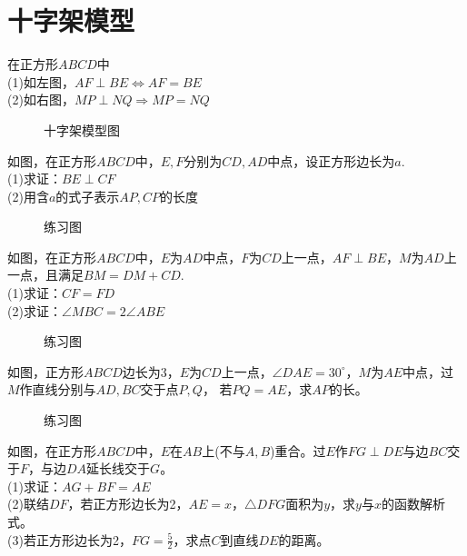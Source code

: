 \section{十字架模型}
\begin{definition}
    在正方形$ABCD$中 \\
    (1)如左图，$AF\perp BE \Leftrightarrow AF=BE$ \\
    (2)如右图，$MP\perp NQ \Rightarrow MP=NQ$
\end{definition}
\begin{figure}[H]
    \centering
    \resizebox{6cm}{!}{}
    \caption{十字架模型图}
\end{figure}
\begin{problem}
如图，在正方形$ABCD$中，$E,F$分别为$CD,AD$中点，设正方形边长为$a$. \\
(1)求证：$BE\perp CF$ \\
(2)用含$a$的式子表示$AP,CP$的长度
\end{problem}
\begin{figure}[H]
    \centering
    \resizebox{3cm}{!}{}
    \caption{练习图}
\end{figure}
\begin{problem}
如图，在正方形$ABCD$中，$E$为$AD$中点，$F$为$CD$上一点，$AF\perp BE$，$M$为$AD$上一点，且满足$BM=DM+CD$. \\
(1)求证：$CF=FD$ \\
(2)求证：$\angle MBC=2\angle ABE$
\end{problem}
\begin{figure}[H]
    \centering
    \resizebox{4cm}{!}{}
    \caption{练习图}
\end{figure}
\begin{problem}
如图，正方形$ABCD$边长为3，$E$为$CD$上一点，$\angle DAE=30^\circ$，$M$为$AE$中点，过$M$作直线分别与$AD,BC$交于点$P,Q$，
若$PQ=AE$，求$AP$的长。
\end{problem}
\begin{figure}[H]
    \centering
    \resizebox{3cm}{!}{}
    \caption{练习图}
\end{figure}
\begin{problem}
如图，在正方形$ABCD$中，$E$在$AB$上(不与$A,B$)重合。过$E$作$FG\perp DE$与边$BC$交于$F$，与边$DA$延长线交于$G$。 \\
(1)求证：$AG+BF=AE$ \\
(2)联结$DF$，若正方形边长为2，$AE=x$，$\triangle DFG$面积为$y$，求$y$与$x$的函数解析式。\\
(3)若正方形边长为2，$FG=\frac{5}{2}$，求点$C$到直线$DE$的距离。\\
\end{problem}

